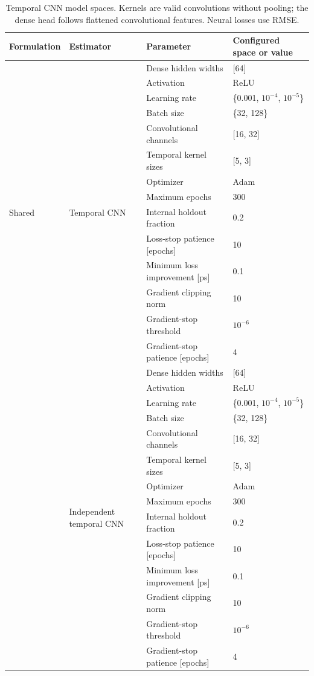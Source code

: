 \begin{table}[t]
\centering
\small
\begin{tabularx}{\textwidth}{@{}p{}p{}p{}X@{}}
\toprule
Formulation & Estimator & Parameter & Configured space or value \\
\midrule
\multirow[t]{14}{*}{Shared} & \multirow[t]{14}{=}{Temporal CNN} & Dense hidden widths & [64] \\
 &  & Activation & ReLU \\
 &  & Learning rate & \{0.001, $10^{-4}$, $10^{-5}$\} \\
 &  & Batch size & \{32, 128\} \\
 &  & Convolutional channels & [16, 32] \\
 &  & Temporal kernel sizes & [5, 3] \\
 &  & Optimizer & Adam \\
 &  & Maximum epochs & 300 \\
 &  & Internal holdout fraction & 0.2 \\
 &  & Loss-stop patience [epochs] & 10 \\
 &  & Minimum loss improvement [ps] & 0.1 \\
 &  & Gradient clipping norm & 10 \\
 &  & Gradient-stop threshold & $10^{-6}$ \\
 &  & Gradient-stop patience [epochs] & 4 \\
\addlinespace[3pt]
\hdashline
\addlinespace[3pt]
\multirow[t]{14}{*}{Direct} & \multirow[t]{14}{=}{Independent temporal CNN} & Dense hidden widths & [64] \\
 &  & Activation & ReLU \\
 &  & Learning rate & \{0.001, $10^{-4}$, $10^{-5}$\} \\
 &  & Batch size & \{32, 128\} \\
 &  & Convolutional channels & [16, 32] \\
 &  & Temporal kernel sizes & [5, 3] \\
 &  & Optimizer & Adam \\
 &  & Maximum epochs & 300 \\
 &  & Internal holdout fraction & 0.2 \\
 &  & Loss-stop patience [epochs] & 10 \\
 &  & Minimum loss improvement [ps] & 0.1 \\
 &  & Gradient clipping norm & 10 \\
 &  & Gradient-stop threshold & $10^{-6}$ \\
 &  & Gradient-stop patience [epochs] & 4 \\
\bottomrule
\end{tabularx}
\caption{Temporal CNN model spaces. Kernels are valid convolutions without pooling; the dense head follows flattened convolutional features. Neural losses use RMSE.}
\label{tab:space-temporal-cnn}
\end{table}
